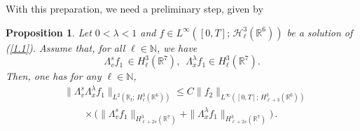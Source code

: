 \documentclass{amsart}[12pt, article]
\newtheorem{prop}[theo]{Proposition}
\begin{document}
With this preparation, we need a preliminary step, given by
\begin{prop}\label{prop5.4.2}
Let $0<\lambda< 1$ and $f\in L^\infty([0, T];\, \mathcal{H}^3_\ell ({{{\mathbb R}}}^6))$
be a solution of (\ref{1.1}). Assume that, for all
$\ell \in{{\mathbb N}}$, we have
\begin{equation*}\label{5.3.13}
\Lambda^{s}_{v} f_1 \, \in H^3_\ell({{{\mathbb R}}}^7),\,\,
\, \Lambda^{\lambda}_{x} f_1\in
H^3_\ell({{{\mathbb R}}}^7).
\end{equation*}
Then, one has for any $\ell  \in{{\mathbb N}}$,
\begin{align*}
&\|\Lambda^{s}_v \Lambda^{\lambda}_{x}  f_1 \|_{
L^2({{{\mathbb R}}}_t;\, H^3_\ell  ({{{\mathbb R}}}^6))}\leq C \|f_2\|_{L^\infty([0,
T];\,H^{3}_{\ell+3}({{{\mathbb R}}}^6))}\\
&\qquad\times\Big(\|\Lambda^{s}_v f_1 \|_{
H^3_{\ell+2s}({{{\mathbb R}}}^7)}+\|\Lambda^{\lambda}_{x}  f_1
\|_{ H^3_{\ell+2s}({{{\mathbb R}}}^7)}\Big)\, .
\end{align*}
\end{prop}
\end{document}
